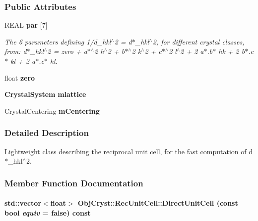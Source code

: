 \subsubsection*{Public Attributes}
\begin{DoxyCompactItemize}
\item 
REAL {\bf par} [7]
\begin{DoxyCompactList}\small\item\em The 6 parameters defining 1/d\_\-hkl$^\wedge$2 = d$\ast$\_\-hkl$^\wedge$2, for different crystal classes, from: d$\ast$\_\-hkl$^\wedge$2 = zero + a$\ast$$^\wedge$2 h$^\wedge$2 + b$\ast$$^\wedge$2 k$^\wedge$2 + c$\ast$$^\wedge$2 l$^\wedge$2 + 2 a$\ast$.b$\ast$ hk + 2 b$\ast$.c$\ast$ kl + 2 a$\ast$.c$\ast$ hl. \item\end{DoxyCompactList}\item 
float {\bfseries zero}\label{a00069_accd778c87bc4c93b7d259b65b9c6d794}

\item 
{\bf CrystalSystem} {\bfseries mlattice}\label{a00069_ab751018126adbc0306ec2bc5f582547a}

\item 
CrystalCentering {\bfseries mCentering}\label{a00069_a203d74dc8d3b23a592230be7685f45b9}

\end{DoxyCompactItemize}


\subsubsection{Detailed Description}
Lightweight class describing the reciprocal unit cell, for the fast computation of d$\ast$\_\-hkl$^\wedge$2. 

\subsubsection{Member Function Documentation}
\paragraph[{DirectUnitCell}]{\setlength{\rightskip}{0pt plus 5cm}std::vector$<$float$>$ ObjCryst::RecUnitCell::DirectUnitCell (const bool {\em equiv} = {\ttfamily false}) const}\hfill\label{a00069_acf2fe1cbb89b8388a9d7c6fe4e3078a9}


